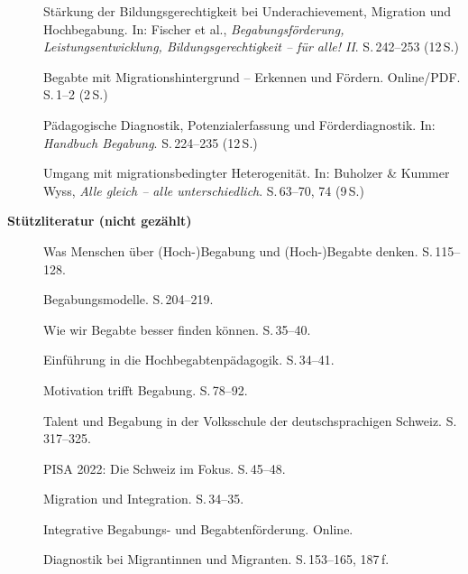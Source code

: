 \documentclass[ngerman, a4paper]{article}
\begin{document}
\begin{description}
  \item[\cite{warneckehauke2020bildungsgerechtigkeit}] Stärkung der Bildungsgerechtigkeit bei Underachievement, Migration und Hochbegabung.
        In: Fischer et al., \textit{Begabungsförderung, Leistungsentwicklung,
          Bildungsgerechtigkeit -- für alle! II}.
        S.\,242--253 (12\,S.)

  \item[\cite{kellerkoller2013erkennen}] Begabte mit Migrationshintergrund -- Erkennen und Fördern.
        Online/PDF. S.\,1--2 (2\,S.)

  \item[\cite{muelleroppliger2021paeddiagnostik}] Pädagogische Diagnostik, Potenzialerfassung und Förderdiagnostik.
        In: \textit{Handbuch Begabung}.
        S.\,224--235 (12\,S.)

  \item[\cite{kappus2010migration}] Umgang mit migrationsbedingter Heterogenität.
        In: Buholzer \& Kummer Wyss, \textit{Alle gleich -- alle unterschiedlich}.
        S.\,63--70, 74 (9\,S.)
\end{description}

\textbf{Stützliteratur (nicht gezählt)}

\begin{description}
  \item[\cite{baudson2021wasdenken}] Was Menschen über
        (Hoch-)Begabung und (Hoch-)Begabte denken. S.\,115--128.

  \item[\cite{muelleroppliger2021begabungsmodelle}] Begabungsmodelle.
        S.\,204--219.

  \item[\cite{baudson2025besserfinden}] Wie wir Begabte besser finden
        können. S.\,35--40.

  \item[\cite{trautmann2016einfuehrung}] Einführung in die
        Hochbegabtenpädagogik. S.\,34--41.

  \item[\cite{lehwald2017motivation}] Motivation trifft Begabung.
        S.\,78--92.

  \item[\cite{grossenbacher2014integrative}] Talent und Begabung in der
        Volksschule der deutschsprachigen Schweiz. S.\,317--325.

  \item[\cite{erzinger2023pisa}] PISA 2022: Die Schweiz im Fokus.
        S.\,45--48.

  \item[\cite{bfs2022migration}] Migration und Integration.
        S.\,34--35.

  \item[\cite{dvs2025bbf}] Integrative Begabungs- und
        Begabtenförderung. Online.

  \item[\cite{maehler2018diagnostik}] Diagnostik bei Migrantinnen und
        Migranten. S.\,153--165, 187\,f.
\end{description}
\end{document}
